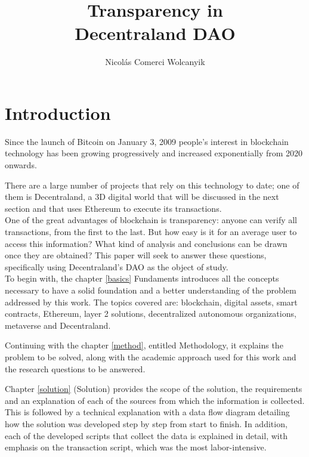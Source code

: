 \documentclass[MSE,Master,english]{twbook}%
\title{Transparency in\\Decentraland DAO}
\author{Nicol{\'a}s Comerci Wolcanyik}
\begin{document}
\maketitle

%
%
\chapter{Introduction\label{intro}}
Since the launch of Bitcoin on January 3, 2009 people's interest in blockchain technology has been growing progressively and increased exponentially from 2020 onwards. 

There are a large number of projects that rely on this technology to date; one of them is Decentraland, a 3D digital world that will be discussed in the next section and that uses Ethereum to execute its transactions. \\

One of the great advantages of blockchain is transparency: anyone can verify all transactions, from the first to the last. But how easy is it for an average user to access this information? What kind of analysis and conclusions can be drawn once they are obtained? This paper will seek to answer these questions, specifically using Decentraland's \gls{DAO} as the object of study. \\

To begin with, the chapter \ref{basics} Fundaments introduces all the concepts necessary to have a solid foundation and a better understanding of the problem addressed by this work. The topics covered are: blockchain, digital assets, smart contracts, Ethereum, layer 2 solutions, decentralized autonomous organizations, metaverse and Decentraland.

Continuing with the chapter \ref{method}, entitled Methodology, it explains the problem to be solved, along with the academic approach used for this work and the research questions to be answered.

Chapter \ref{solution} (Solution) provides the scope of the solution, the requirements and an explanation of each of the sources from which the information is collected. This is followed by a technical explanation with a data flow diagram detailing how the solution was developed step by step from start to finish. In addition, each of the developed scripts that collect the data is explained in detail, with emphasis on the transaction script, which was the most labor-intensive.
\end{document}
